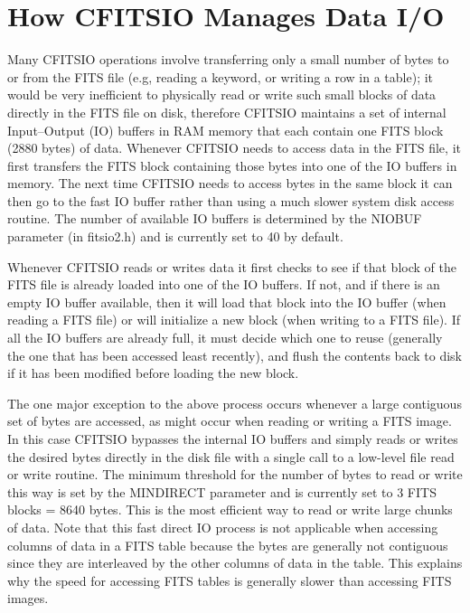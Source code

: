 \documentclass[11pt]{book}
\begin{document}
\section{How CFITSIO Manages Data I/O}

Many CFITSIO operations involve transferring only a small number of
bytes to or from the FITS file (e.g, reading a keyword, or writing a
row in a table); it would be very inefficient to physically read or
write such small blocks of data directly in the FITS file on disk,
therefore CFITSIO maintains a set of internal Input--Output (IO)
buffers in RAM memory that each contain one FITS block (2880 bytes) of
data.  Whenever CFITSIO needs to access data in the FITS file, it first
transfers the FITS block containing those bytes into one of the IO
buffers in memory.  The next time CFITSIO needs to access bytes in the
same block it can then go to the fast IO buffer rather than using a
much slower system disk access routine.  The number of available IO
buffers is determined by the NIOBUF parameter (in fitsio2.h) and is
currently set to 40 by default.

Whenever CFITSIO reads or writes data it first checks to see if that
block of the FITS file is already loaded into one of the IO buffers.
If not, and if there is an empty IO buffer available, then it will load
that block into the IO buffer (when reading a FITS file) or will
initialize a new block (when writing to a FITS file).  If all the IO
buffers are already full, it must decide which one to reuse (generally
the one that has been accessed least recently), and flush the contents
back to disk if it has been modified before loading the new block.

The one major exception to the above process occurs whenever a large
contiguous set of bytes are accessed, as might occur when reading or
writing a FITS image.  In this case CFITSIO bypasses the internal IO
buffers and simply reads or writes the desired bytes directly in the
disk file with a single call to a low-level file read or write
routine.  The minimum threshold for the number of bytes to read or
write this way is set by the MINDIRECT parameter and is currently set
to 3 FITS blocks = 8640 bytes.  This is the most efficient way to read
or write large chunks of data.  Note that this fast direct IO process is not
applicable when accessing columns of data in a FITS table because the
bytes are generally not contiguous since they are interleaved by the
other columns of data in the table.  This explains why the speed for
accessing FITS tables is generally slower than accessing
FITS images.
\end{document}
